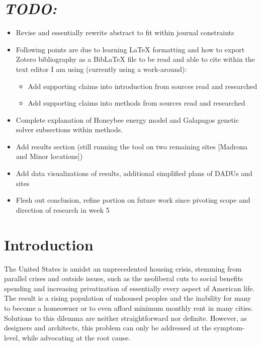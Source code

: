 \documentclass[sagev,doublespace,times,Review]{sagej}
\begin{document}

\maketitle

\section{\textit{TODO:}}
\begin{itemize}
	\item Revise and essentially rewrite abstract to fit within journal constraints
	\item Following points are due to learning LaTeX formatting and how to export Zotero bibliography as a BibLaTeX file to be read and able to cite within the text editor I am using (currently using a work-around): \begin{itemize} 
	\item Add supporting claims into introduction from sources read and researched
	\item Add supporting claims into methods from sources read and researched \end{itemize}
	\item Complete explanation of Honeybee energy model and Galapagos genetic solver subsections within methods.
	\item Add results section (still running the tool on two remaining sites [Madrona and Minor locations])
	\item Add data visualizations of results, additional simplified plans of DADUs and sites
	\item Flesh out conclusion, refine portion on future work since pivoting scope and direction of research in week 5
\end{itemize}

\section{Introduction}
The United States is amidst an unprecedented housing crisis, stemming from parallel crises and outside issues, such as the neoliberal cuts to social benefits spending and increasing privatization of essentially every aspect of American life. The result is a rising population of unhoused peoples and the inability for many to become a homeowner or to even afford minimum monthly rent in many cities. Solutions to this dilemma are neither straightforward nor definite. However, as designers and architects, this problem can only be addressed at the symptom-level, while advocating at the root cause. 
\end{document}
